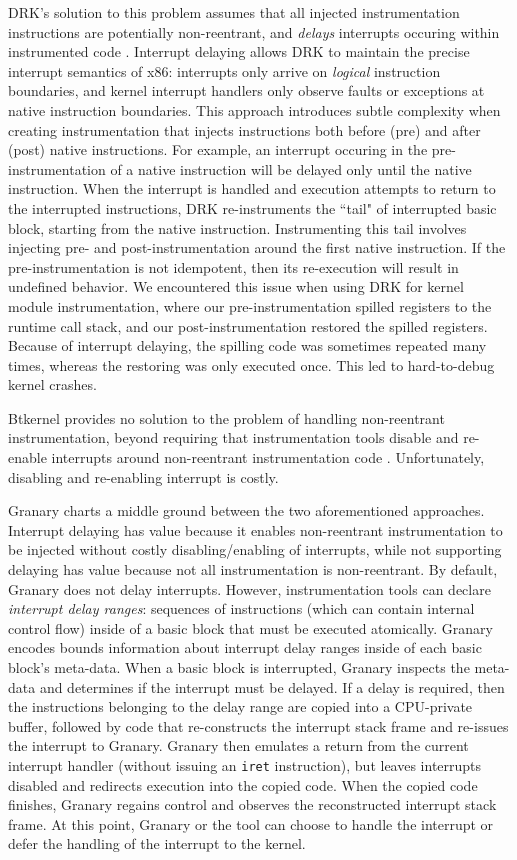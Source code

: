 \documentclass[preprint]{sigplanconf}
\begin{document}
DRK's solution to this problem assumes that all injected instrumentation instructions are potentially non-reentrant, and \emph{delays} interrupts occuring within instrumented code \cite{DRK}. Interrupt delaying allows DRK to maintain the precise interrupt semantics of x86: interrupts only arrive on \emph{logical} instruction boundaries, and kernel interrupt handlers only observe faults or exceptions at native instruction boundaries. This approach introduces subtle complexity when creating instrumentation that injects instructions both before (pre) and after (post) native instructions. For example, an interrupt occuring in the pre-instrumentation of a native instruction will be delayed only until the native instruction. When the interrupt is handled and execution attempts to return to the interrupted instructions, DRK re-instruments the ``tail" of interrupted basic block, starting from the native instruction. Instrumenting this tail involves injecting pre- and post-instrumentation around the first native instruction. If the pre-instrumentation is not idempotent, then its re-execution will result in undefined behavior. We encountered this issue when using DRK for kernel module instrumentation, where our pre-instrumentation spilled registers to the runtime call stack, and our post-instrumentation restored the spilled registers. Because of interrupt delaying, the spilling code was sometimes repeated many times, whereas the restoring was only executed once. This led to hard-to-debug kernel crashes.

Btkernel provides no solution to the problem of handling non-reentrant instrumentation, beyond requiring that instrumentation tools disable and re-enable interrupts around non-reentrant instrumentation code \cite{btkernel}. Unfortunately, disabling and re-enabling interrupt is costly.

Granary charts a middle ground between the two aforementioned approaches. Interrupt delaying has value because it enables non-reentrant instrumentation to be injected without costly disabling/enabling of interrupts, while not supporting delaying has value because not all instrumentation is non-reentrant. By default, Granary does not delay interrupts. However, instrumentation tools can declare \emph{interrupt delay ranges}: sequences of instructions (which can contain internal control flow) inside of a basic block that must be executed atomically. Granary encodes bounds information about interrupt delay ranges inside of each basic block's meta-data. When a basic block is interrupted, Granary inspects the meta-data and determines if the interrupt must be delayed. If a delay is required, then the instructions belonging to the delay range are copied into a CPU-private buffer, followed by code that re-constructs the interrupt stack frame and re-issues the interrupt to Granary. Granary then emulates a return from the current interrupt handler (without issuing an \texttt{iret} instruction), but leaves interrupts disabled and redirects execution into the copied code. When the copied code finishes, Granary regains control and observes the reconstructed interrupt stack frame. At this point, Granary or the tool can choose to handle the interrupt or defer the handling of the interrupt to the kernel.
\end{document}
